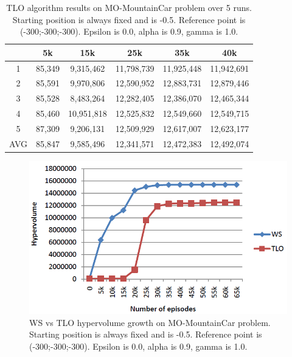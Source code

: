 \begin{table}[t]
\centering
\def\arraystretch{1.5}
\begin{tabular}{|c|c|c|c|c|c|}
  \hline
  & 5k & 15k & 25k & 35k & 40k \\
  \hline
  1 & 85,349 & 9,315,462 & 11,798,739 & 11,925,448 & 11,942,691 \\
  \hline
  2 & 85,591 & 9,970,806 & 12,590,952 & 12,883,731 & 12,879,446 \\
  \hline
  3 & 85,528 & 8,483,264 & 12,282,405 & 12,386,070 & 12,465,344 \\
  \hline
  4 & 85,460 & 10,951,818 & 12,525,832 & 12,549,660 & 12,549,715 \\
  \hline
  5 & 87,309 & 9,206,131 & 12,509,929 & 12,617,007 & 12,623,177 \\
  \hline
  AVG & 85,847 & 9,585,496 & 12,341,571 & 12,472,383 & 12,492,074 \\
  \hline
\end{tabular}
\caption{TLO algorithm results on MO-MountainCar problem over 5 runs. Starting position is always fixed and is -0.5. Reference point is (-300;-300;-300). Epsilon is 0.0, alpha is 0.9, gamma is 1.0.}
\label{tab:mo-mountaincar-2}
\end{table}

\begin{figure}[ht]
\centering
\includegraphics[scale=0.6]{MCResults.png}
\caption{WS vs TLO hypervolume growth on MO-MountainCar problem. Starting position is always fixed and is -0.5. Reference point is (-300;-300;-300). Epsilon is 0.0, alpha is 0.9, gamma is 1.0.}
\label{fig:ws-tlo-mc-results}
\end{figure}

